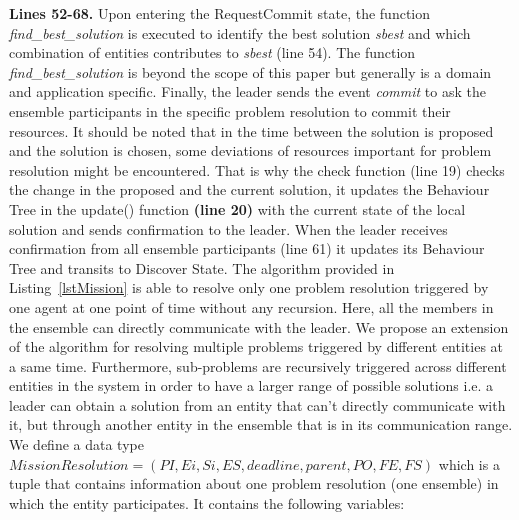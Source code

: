 \documentclass[journal]{IEEEtran}
\theoremstyle{definition}
\begin{document}
\textbf{Lines 52-68.}
Upon entering the RequestCommit state, the function \textit{find\_best\_solution} is executed to identify the best solution \textit{sbest} and which combination of entities contributes to \textit{sbest} (line 54). The function \textit{find\_best\_solution} is beyond the scope of this paper but generally is a domain and application specific. Finally, the leader sends the event \textit{commit} to ask the ensemble participants in the specific problem resolution to commit their resources. 
It should be noted that in the time between the solution is proposed and the solution is chosen, some deviations of resources important for problem resolution might be encountered. That is why the check function (line 19) checks the change in the proposed and the current solution, it updates the Behaviour Tree in the update() function \textbf{(line 20)} with the current state of the local solution and sends confirmation to the leader. When the leader receives confirmation from all ensemble participants (line 61) it updates its Behaviour Tree and transits to Discover State. 
The algorithm provided in Listing~\ref{lstMission} is able to resolve only one problem resolution triggered by one agent at one point of time without any recursion. Here, all the members in the ensemble can directly communicate with the leader. We propose an extension of the algorithm for resolving multiple problems triggered by different entities at a same time. Furthermore, sub-problems are recursively triggered across different entities in the system in order to have a larger range of possible solutions i.e. a leader can obtain a solution from an entity that can't directly communicate with it, but through another entity in the ensemble that is in its communication range. We define a data type  $MissionResolution = (PI, Ei, Si, ES, deadline, parent, PO, FE, FS)$ which is a tuple that contains information about one problem resolution (one ensemble) in which the entity participates.
It contains the following variables:
\end{document}
